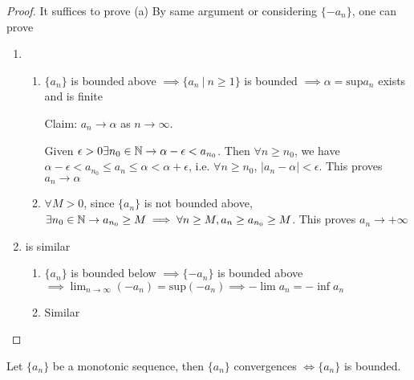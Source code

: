 \begin{proof}

	It suffices to prove (a) By same argument or considering $\{-a_n\}$, one can prove
	
	\begin{enumerate}[label = $(\alph*)$]
		\item \begin{enumerate}[label = $(\roman* )$]
				\item $\{a_n\}$ is bounded above $\implies \{a_n ~|~ n \geq 1\}$ is bounded $\implies \alpha = \text{sup}a_n$ exists and is finite
			
				Claim: $a_n \rightarrow \alpha$ as $n \rightarrow \infty$.
			
				Given $\epsilon > 0 \exists n_0 \in \mathbb{N} \rightarrow \alpha - \epsilon < a_{n_0}$. Then $\forall n \geq n_0$, we have $\alpha - \epsilon < a_{n_0} \leq a_n \leq \alpha < \alpha + \epsilon$, i.e. $\forall n \geq n_0$, $|a_n - \alpha| < \epsilon$. This proves $a_n \rightarrow \alpha$
			\item $\forall M > 0$, since $\{a_n\}$ is not bounded above, $\exists n_0 \in \mathbb{N} \rightarrow a_{n_0} \geq M \implies \forall n \geq M, a_n \geq a_{n_0} \geq M$. This proves $a_n \rightarrow + \infty$
		\end{enumerate}
		
		\item is similar
		
		\begin{enumerate}[wide,label = $(\roman* ')$]
			\item $\{a_n\}$ is bounded below $\implies \{-a_n\}$ is bounded above $\implies \lim_{n \rightarrow \infty}(-a_n) = \text{sup}(-a_n) \implies -\lim a_n = - \inf a_n$
			\item Similar
			
		\end{enumerate}
		
		\end{enumerate}

	
\end{proof}

\begin{rmk*}
	Let $\{a_n\}$ be a monotonic sequence, then $\{a_n\}$ convergences $\Leftrightarrow \{a_n\}$ is bounded.	
\end{rmk*}


